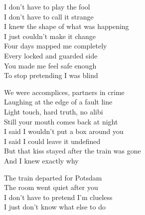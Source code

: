 \begin{lyrics}
I don't have to play the fool\\
I don't have to call it strange\\
I knew the shape of what was happening\\
I just couldn't make it change\\
Four days mapped me completely\\
Every locked and guarded side\\
You made me feel safe enough\\
To stop pretending I was blind

We were accomplices, partners in crime\\
Laughing at the edge of a fault line\\
Light touch, hard truth, no alibi\\
Still your mouth comes back at night\\
I said I wouldn't put a box around you\\
I said I could leave it undefined\\
But that kiss stayed after the train was gone\\
And I knew exactly why

The train departed for Potsdam\\
The room went quiet after you\\
I don't have to pretend I'm clueless\\
I just don't know what else to do
\end{lyrics}

